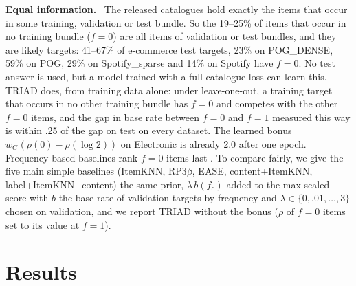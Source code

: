 \documentclass[runningheads]{llncs}
\renewcommand{\paragraph}[1]{\smallskip\noindent\textbf{#1}\ }
\begin{document}
\paragraph{Equal information.} The released catalogues hold exactly the items that occur in some training, validation
or test bundle. So the 19--25\% of items that occur in no training bundle ($f=0$) are all items of validation or test
bundles, and they are likely targets: 41--67\% of e-commerce test targets, 23\% on POG\_DENSE, 59\% on POG, 29\% on
Spotify\_sparse and 14\% on Spotify have $f=0$. No test answer is used, but a model trained with a full-catalogue loss
can learn this. TRIAD does, from training data alone: under leave-one-out, a training target that occurs in no other
training bundle has $f=0$ and competes with the other $f=0$ items, and the gap in base rate between $f=0$ and $f=1$
measured this way is within .25 of the gap on test on every dataset. The learned bonus $w_G(\rho(0)-\rho(\log 2))$ on
Electronic is already 2.0 after one epoch. Frequency-based baselines rank $f=0$ items last \cite{abdollahpouri2017}.
To compare fairly, we give the five main simple baselines (ItemKNN, RP3$\beta$, EASE, content+ItemKNN,
label+ItemKNN+content) the same prior, $\lambda\,b(f_c)$ added to the max-scaled score with $b$ the base rate of
validation targets by frequency and $\lambda\in\{0,.01,\dots,3\}$ chosen on validation, and we report TRIAD without
the bonus ($\rho$ of $f=0$ items set to its value at $f=1$).

\section{Results}
\end{document}
